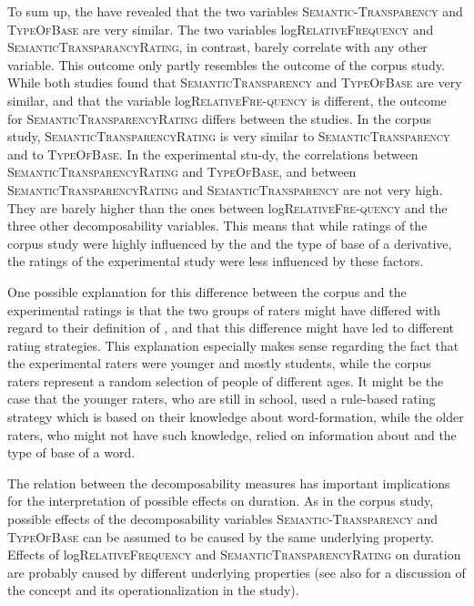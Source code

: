  To sum up, the  have revealed that the two variables \textsc{Semantic-Transparency} and \textsc{TypeOfBase} are very similar. The two variables log\textsc{Rela\-tiveFrequency} and \textsc{SemanticTransparancyRating}, in contrast, barely correlate with any other  variable.
This outcome only partly resembles the outcome of the corpus study. While both studies found that \textsc{SemanticTransparency} and \textsc{TypeOfBase} are very similar, and that the variable log\textsc{RelativeFre-quency} is different, the outcome for \textsc{SemanticTransparencyRating} differs between the studies. 
In the corpus study, \textsc{SemanticTransparencyRating} is very similar to \textsc{SemanticTransparency} and to \textsc{TypeOfBase}. In the experimental stu-dy, the correlations between \textsc{SemanticTransparencyRating} and \textsc{TypeOfBase}, and between \textsc{SemanticTransparencyRating}  and \textsc{SemanticTransparency} are not very high. They are barely higher than the ones between log\textsc{RelativeFre-quency} and the three other decomposability variables. 
This means that while ratings of the corpus study were highly influenced by the  and the type of base of a derivative, the ratings of the experimental study were less influenced by these factors.

 
 One possible explanation for this difference between the corpus and the experimental ratings is that the two groups of raters might have differed with regard to their definition of , and that this difference might have led to different rating strategies. This explanation especially makes sense regarding the fact that the experimental raters were younger and mostly students, while the corpus raters represent a random selection of people of different ages. It might be the case that the younger raters, who are still in school, used a rule-based rating strategy which is based on their knowledge about word-formation, while the older raters, who might not have such knowledge, relied on information about  and the type of base of a word. 

 The relation between the decomposability measures has important implications for the interpretation of possible  effects on duration. As in the corpus study, possible effects of the decomposability variables \textsc{Semantic-Transparency} and \textsc{TypeOfBase} can be assumed to be caused by the same underlying property. 
 Effects of log\textsc{RelativeFrequency} and \textsc{SemanticTransparencyRating} on duration are probably caused by different underlying properties (see also  for a discussion of the concept  and its operationalization in the study).
 
